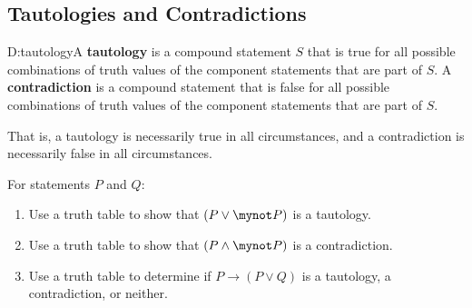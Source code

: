 \subsection*{Tautologies and Contradictions}
\begin{defbox}{D:tautology}{A \textbf{tautology}
%
 is a compound statement $S$ that is true for all possible combinations of truth values of the component statements that are part of $S$.  A \textbf{contradiction}
%
 is a compound statement that is false for all possible combinations of truth values of the component statements that are part of $S$.}
\end{defbox}
That is, a tautology is necessarily true in all circumstances, and a contradiction is necessarily false in all circumstances.

\begin{prog} \label{pr:tautology} \hfill 
For statements $P$ and $Q$:
\begin{enumerate}
\item Use  a truth table to show that  $\left( {P \vee \mynot  P} \right)$ is a tautology.
\item Use a truth table to show that  $\left( {P \wedge \mynot  P} \right)$ is a contradiction.
\item Use a truth table to determine if $P \to (P \vee Q)$ is a tautology, a contradiction, or neither.
\end{enumerate}
\end{prog}
\hbreak

\endinput
